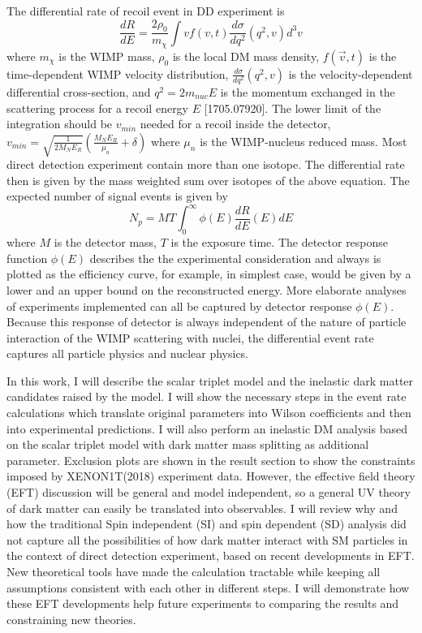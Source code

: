 \documentclass[12pt]{article}
\begin{document}
The differential rate of recoil event in DD experiment is 
$$
\frac{dR}{dE} = \frac{2\rho_0}{m_\chi}\int vf(v,t)\frac{d\sigma}{dq^2}(q^2,v)d^3v
$$
where $m_\chi$ is the WIMP mass, $\rho_0$ is the local DM mass density, $f(\vec v,t)$ is the time-dependent WIMP velocity distribution, $\frac{d\sigma}{dq^2} (q^2,v) $ is the velocity-dependent differential cross-section, and $q^2= 2m_{nuc}E$ is the momentum exchanged in the scattering process for a recoil energy $E$ [1705.07920]. The lower limit of the integration should be $v_{min}$ needed for a recoil inside the detector, $v_{min} = \sqrt{\frac{1}{2M_NE_R}}(\frac{M_NE_R}{\mu_n}+\delta)$ where $\mu_n$ is the WIMP-nucleus reduced mass. Most direct detection experiment contain more than one isotope. The differential rate then is given by the mass weighted sum over isotopes of the above equation. The expected number of signal events is given by 
$$
 N_p = MT\int_0^\infty \phi(E)\frac{dR}{dE}(E)dE
 $$
 where $M$ is the detector mass, $T$ is the exposure time. The detector response function $\phi(E)$ describes the the experimental consideration and always is plotted as the efficiency curve, for example, in simplest case, would be given by a lower and an upper bound on the reconstructed energy. More elaborate analyses of experiments implemented can all be captured by detector response $\phi(E)$.  Because this response of detector is always independent of the nature of particle interaction of the WIMP scattering with nuclei, the differential event rate captures all particle physics and nuclear physics. 



In this work, I will describe the scalar triplet model and the inelastic dark matter candidates raised by the model. I will show the necessary steps in the event rate calculations which translate original parameters into Wilson coefficients and then into experimental predictions.  I will also perform an inelastic DM analysis based on the scalar triplet model with dark matter mass splitting as additional parameter. Exclusion plots are shown in the result section to show the constraints imposed by XENON1T(2018) experiment data. However, the effective field theory (EFT) discussion will be general and model independent, so a general UV theory of dark matter can easily be translated into observables. I will review why and how the traditional Spin independent (SI) and spin dependent (SD) analysis did not capture all the possibilities of how dark matter interact with SM particles in the context of direct detection experiment, based on recent developments in EFT. New theoretical tools have made the calculation tractable while keeping all assumptions consistent with each other in different steps. I will demonstrate how these EFT developments help future experiments to comparing the results and constraining new theories. 
\end{document}
